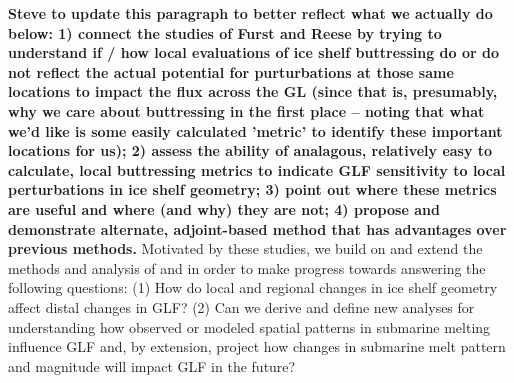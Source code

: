 \documentclass[tc, manuscript]{copernicus}
\begin{document}


\textbf{Steve to update this paragraph to better reflect what we actually do below: 1) connect the studies of Furst and Reese by trying to understand if / how local evaluations of ice shelf buttressing do or do not reflect the actual potential for purturbations at those same locations to impact the flux across the GL (since that is, presumably, why we care about buttressing in the first place -- noting that what we'd like is some easily calculated 'metric' to identify these important locations for us); 2) assess the ability of analagous, relatively easy to calculate, local buttressing metrics to indicate GLF sensitivity to local perturbations in ice shelf geometry; 3) point out where these metrics are useful and where (and why) they are not; 4) propose and demonstrate alternate, adjoint-based method that has advantages over previous methods.}
Motivated by these studies, we build on and extend the methods and analysis of \citet{furst2016} and \citet{reese2018} in order to make progress towards answering the following questions: 
(1) How do local and regional changes in ice shelf geometry affect distal changes in GLF? 
(2) Can we derive and define new analyses for understanding how observed or modeled spatial patterns in submarine melting influence GLF and, by extension, project how changes in submarine melt pattern and magnitude will impact GLF in the future?     
\end{document}
